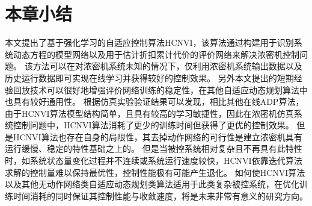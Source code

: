 \section{本章小结}
\label{sec:conclusion}
本文提出了基于强化学习的自适应控制算法HCNVI，该算法通过构建用于识别系统动态方程的模型网络以及用于估计折扣累计代价的评价网络来解决浓密机控制问题。
该方法可以在对浓密机系统未知的情况下，仅利用浓密机系统输出数据以及历史运行数据即可实现在线学习并获得较好的控制效果。
另外本文提出的短期经验回放技术可以很好地增强评价网络训练的稳定性，在其他自适应动态规划算法中也具有较好通用性。
根据仿真实验验证结果可以发现，相比其他在线ADP算法，由于HCNVI算法模型结构简单，且具有较高的学习敏捷性，因此在浓密机仿真系统控制问题中，HCNVI算法消耗了更少的训练时间但获得了更优的控制效果。
但是HCNVI算法也存在自身的局限性，其去掉动作网络的可行性是建立浓密机具有运行缓慢、稳定的特性基础之上的。
但是当被控系统相对复杂且不再具有此特性时，如系统状态量变化过程并不连续或系统运行速度较快，HCNVI依靠迭代算法求解的控制量难以保持最优性，控制性能极有可能产生退化。
如何使HCNVI算法以及其他无动作网络类自适应动态规划类算法适用于此类复杂被控系统，在优化训练时间消耗的同时保证其控制性能与收敛速度，将是未来非常有意义的研究方向。